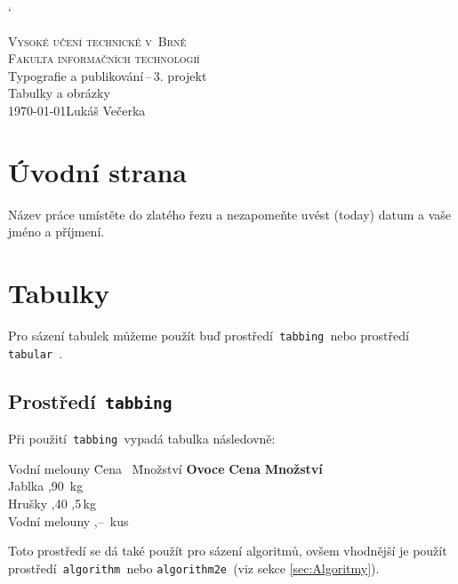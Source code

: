 \documentclass[hidelinks, 11pt, a4paper]{article}
\begin{document}
\catcode` %
\begin{titlepage}
    \begin{center}
        \Huge \textsc{Vysoké učení technické v~Brně}\\
        \huge \textsc{Fakulta informačních technologií}\\[0.5em]
        {\LARGE Typografie a publikování\,--\,3. projekt\\[-0.2em]}
        \Huge Tabulky a obrázky\\
        {\Large \today \hfill Lukáš Večerka}\\
    \end{center}
\end{titlepage}


\section{Úvodní strana}
Název práce umístěte do zlatého řezu a nezapomeňte uvést  (today) datum a vaše jméno a příjmení.

\section{Tabulky}
Pro sázení tabulek můžeme použít buď prostředí\texttt{ tabbing }nebo prostředí\texttt{ tabular }.

\subsection{Prostředí\texttt{ tabbing}}
Při použití\texttt{ tabbing }vypadá tabulka následovně:
\begin{tabbing}
Vodní melouny \quad \= Cena \quad\  \= Množství \kill
\textbf{Ovoce} \> \textbf{Cena} \> \textbf{Množství} \\
Jablka ,90 \,kg \\ 
Hrušky ,40 ,5\,kg \\ 
Vodní melouny ,-- \,kus \\ 
\end{tabbing}
Toto prostředí se dá také použít pro sázení algoritmů, ovšem vhodnější je použít prostředí\texttt{ algorithm~}nebo \texttt{algorithm2e }(viz sekce \ref{sec:Algoritmy}).
\end{document}
